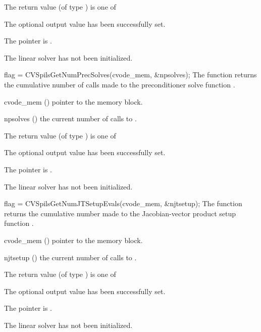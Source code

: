{
  The return value  (of type ) is one of
  \begin{args}
  \item[\Id{CVSPILS\_SUCCESS}] 
    The optional output value has been successfully set.
  \item[\Id{CVSPILS\_MEM\_NULL}]
    The  pointer is .
  \item[\Id{CVSPILS\_LMEM\_NULL}]
    The {\cvspils} linear solver has not been initialized.
  \end{args}
}
{}
{
  flag = CVSpilsGetNumPrecSolves(cvode\_mem, \&npsolves);
}
{
  The function  returns the
  cumulative number of calls made to the preconditioner 
  solve function .
}
{
  \begin{args}
  \item[cvode\_mem] ()
    pointer to the {\cvode} memory block.
  \item[npsolves] ()
    the current number of calls to .
  \end{args}
}
{
  The return value  (of type ) is one of
  \begin{args}
  \item[\Id{CVSPILS\_SUCCESS}] 
    The optional output value has been successfully set.
  \item[\Id{CVSPILS\_MEM\_NULL}]
    The  pointer is .
  \item[\Id{CVSPILS\_LMEM\_NULL}]
    The {\cvspils} linear solver has not been initialized.
  \end{args}
}
{}
{
  flag = CVSpilsGetNumJTSetupEvals(cvode\_mem, \&njtsetup);
}
{
  The function  returns the
  cumulative number made to the Jacobian-vector product setup
  function .
}
{
  \begin{args}
  \item[cvode\_mem] ()
    pointer to the {\cvode} memory block.
  \item[njtsetup] ()
    the current number of calls to .
  \end{args}
}
{
  The return value  (of type ) is one of
  \begin{args}
  \item[\Id{CVSPILS\_SUCCESS}] 
    The optional output value has been successfully set.
  \item[\Id{CVSPILS\_MEM\_NULL}]
    The  pointer is .
  \item[\Id{CVSPILS\_LMEM\_NULL}]
    The {\cvspils} linear solver has not been initialized.
  \end{args}
}
